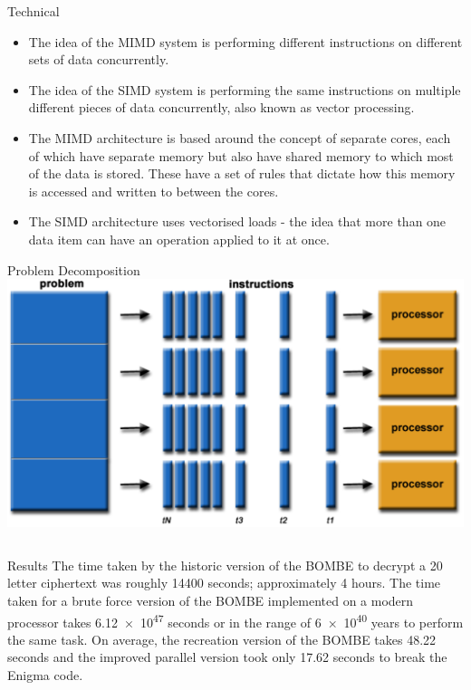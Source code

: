 \documentclass[final]{beamer}
\begin{document}
\begin{frame}{}
\begin{columns}[t]
\begin{column}{.32\linewidth}
        \begin{block}{Technical}
          \begin{itemize}
          \item The idea of the MIMD system is performing different instructions on different sets of data concurrently.
          \item The idea of the SIMD system is performing the same instructions on multiple different pieces of data concurrently, also known as vector processing.
          \item The MIMD architecture is based around the concept of separate cores, each of which have separate memory but also have shared memory to which most of the data is stored. These have a set of rules that dictate how this memory is accessed and written to between the cores.
          \item The SIMD architecture uses vectorised loads - the idea that more than one data item can have an operation applied to it at once.
          \end{itemize}
        \end{block}
        
	\begin{block}{Problem Decomposition}
          \includegraphics[width=\columnwidth]{problemDecomp.png} 
        \end{block}

      \end{column}      
      
      
    \end{columns}

  \vfill
    \begin{block}{\centering Results}
		The time taken by the historic version of the BOMBE to decrypt a 20 letter ciphertext was roughly 14400 seconds; approximately 4 hours. The time taken for a brute force version of the BOMBE implemented on a modern processor takes \num{6.12e47} seconds or in the range of \num{6e40} years to perform the same task. On average, the recreation version of the BOMBE takes 48.22 seconds and the improved parallel version took only 17.62 seconds to break the Enigma code.
    \end{block}
    \vfill

  \end{frame}
\end{document}
